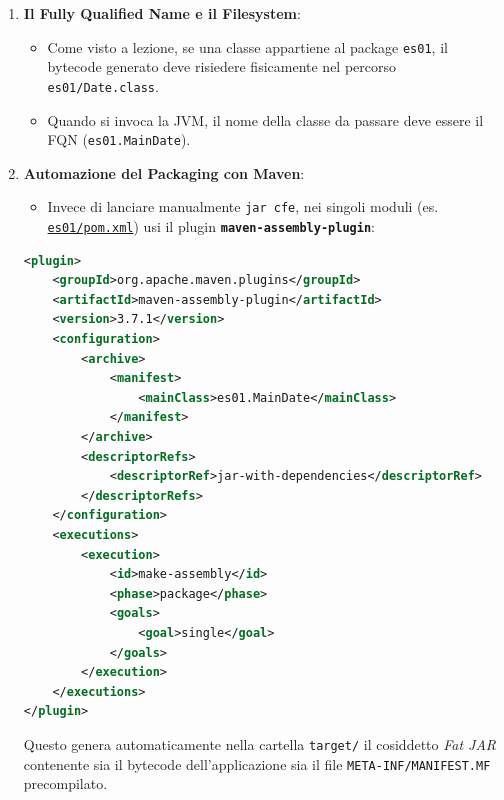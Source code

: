 \documentclass[11pt,a4paper,oneside]{report}
\newcommand{\passthrough}[1]{#1}
\providecommand{\tightlist}{\setlength{\itemsep}{0pt}\setlength{\parskip}{0pt}}
\begin{document}
\begin{enumerate}
\def\labelenumi{\arabic{enumi}.}
\tightlist
\item
  \textbf{Il Fully Qualified Name e il Filesystem}:

  \begin{itemize}
  \tightlist
  \item
    Come visto a lezione, se una classe appartiene al package
    \passthrough{\lstinline!es01!}, il bytecode generato deve risiedere
    fisicamente nel percorso \passthrough{\lstinline!es01/Date.class!}.
  \item
    Quando si invoca la JVM, il nome della classe da passare deve essere
    il FQN (\passthrough{\lstinline!es01.MainDate!}).
  \end{itemize}
\item
  \textbf{Automazione del Packaging con Maven}:

  \begin{itemize}
  \tightlist
  \item
    Invece di lanciare manualmente \passthrough{\lstinline!jar cfe!},
    nei singoli moduli (es.
    \href{file:///home/wally/Documenti/GitHub/Programmazione-II/25-26/esercizi-wally-25-26/es01/pom.xml}{\passthrough{\lstinline!es01/pom.xml!}})
    usi il plugin
    \textbf{\passthrough{\lstinline!maven-assembly-plugin!}}:
  \end{itemize}

\begin{lstlisting}[language=XML]
<plugin>
    <groupId>org.apache.maven.plugins</groupId>
    <artifactId>maven-assembly-plugin</artifactId>
    <version>3.7.1</version>
    <configuration>
        <archive>
            <manifest>
                <mainClass>es01.MainDate</mainClass>
            </manifest>
        </archive>
        <descriptorRefs>
            <descriptorRef>jar-with-dependencies</descriptorRef>
        </descriptorRefs>
    </configuration>
    <executions>
        <execution>
            <id>make-assembly</id>
            <phase>package</phase>
            <goals>
                <goal>single</goal>
            </goals>
        </execution>
    </executions>
</plugin>
\end{lstlisting}

  Questo genera automaticamente nella cartella
  \passthrough{\lstinline!target/!} il cosiddetto \emph{Fat JAR}
  contenente sia il bytecode dell'applicazione sia il file
  \passthrough{\lstinline!META-INF/MANIFEST.MF!} precompilato.
\end{enumerate}
\end{document}
